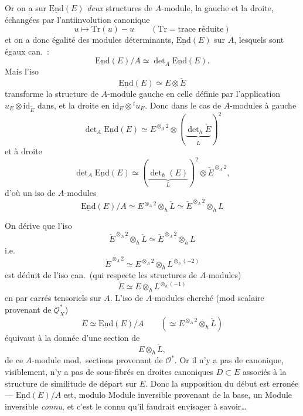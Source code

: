 \documentclass[11pt,a4paper]{article}
\begin{document}
Or on a sur $\underline{\mathrm{End}}(E)$ \emph{deux} structures de $A$-module, la gauche et la droite, échangées par l'antiinvolution canonique
\[
  u \mapsto \mathrm{Tr}(u) - u \qquad (\mathrm{Tr} = \text{trace réduite})
\]
et on a donc égalité des modules déterminants, \struck{\ill{}} $\underline{\mathrm{End}}(E)$ \struck{\ill{}}  sur $A$, lesquels sont égaux can.\ :
\[
  \underline{\mathrm{End}}(E)/A \simeq \det\nolimits_A \underline{\mathrm{End}}(E) .
\]
Mais l'iso
\[
  \underline{\mathrm{End}}(E) \simeq E \otimes \check{E}
\]
transforme la structure de $A$-module gauche en celle définie par l'application $u_E \otimes \mathrm{id}_{\check{E}}$ dans, et la droite en $\mathrm{id}_E \otimes {}^{t}u_E$. Donc dans le cas de $A$-modules à gauche
\[
  \det\nolimits_A \underline{\mathrm{End}}(E) \simeq E^{\otimes_A 2} \otimes (\underbrace{\det\nolimits_h \check{E}}_{\check{L}})^{2}
\]
et à droite
\[
  \det\nolimits_A \underline{\mathrm{End}}(E) \simeq (\underbrace{\det\nolimits_h(E)}_{L})^{2} \otimes \check{E}^{\otimes_A 2},
\]
d'où un iso de $A$-modules
\[
  \underline{\mathrm{End}}(E)/A \simeq E^{\otimes_A 2} \otimes_h \check{L} \simeq \check{E}^{\otimes_A 2} \otimes_h L
\]

On dérive que l'iso
\[
  \check{E}^{\otimes_A 2} \otimes_h \check{L} \simeq \check{E}^{\otimes_A 2} \otimes_h L
\]
i.e.
\[
  \check{E}^{\otimes_A 2} \simeq E^{\otimes_A 2} \otimes_h L^{\otimes_h (-2)}
\]
est déduit de l'iso can.\ (qui respecte les structures de $A$-modules)
\[
  \check{E} \simeq E \otimes_h L^{\otimes_h (-1)}
\]
en \struck{\ill{}} par carrés tensoriels sur $A$. L'iso de $A$-modules cherché (mod scalaire provenant de $\underline{\mathcal{O}}_X^{*}$)
\[
  E \simeq \underline{\mathrm{End}}(E)/A \qquad (\simeq E^{\otimes_A 2} \otimes_h \check{L})
\]
équivaut à la donnée d'une section de
\[
  E \otimes_h \check{L},
\]
 de ce $A$-module mod.\ sections provenant de $\mathcal{O}^{*}$. Or il n'y a pas de canonique, visiblement, \struck{\ill{}}  n'y a pas de sous-fibrés en droites canoniques $D \subset E$ associés à la structure de similitude de départ sur $E$. Donc la supposition du début est erronée — $\underline{\mathrm{End}}(E)/A$ est, modulo Module inversible provenant de la base, un Module inversible \emph{connu}, et c'est le  connu qu'il faudrait envisager à savoir…
\end{document}
